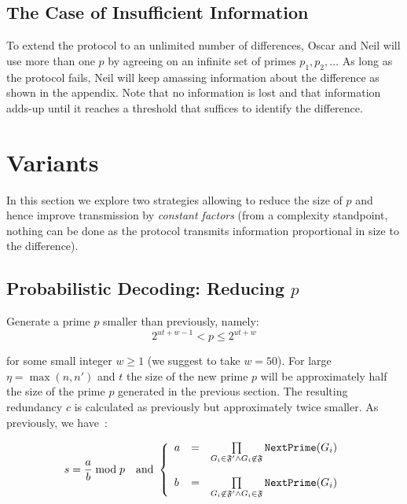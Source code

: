 \documentclass[11pt]{llncs}
\begin{document}
\subsection{The Case of Insufficient Information}

To extend the protocol to an unlimited number of differences, Oscar and Neil will use more than one $p$ by agreeing on an infinite set of primes $p_1,p_2,\ldots$ As long as the protocol fails, Neil will keep amassing information about the difference as shown in the appendix. Note that no information is lost and that information adds-up until it reaches a threshold that suffices to identify the difference.

\section{Variants}

In this section we explore two strategies allowing to reduce the size of $p$ and hence improve transmission by {\sl constant factors} (from a complexity standpoint, nothing can be done as the protocol transmits information proportional in size to the difference).

\subsection{Probabilistic Decoding: Reducing $p$}

Generate a prime $p$ smaller than previously, namely:
\begin{equation}
\label{eqnewp}
2^{ut+w-1}<p \leq 2^{ut+w}
\end{equation}

for some small integer $w \geq 1$ (we suggest to take $w=50$). For large $\eta=\max(n,n')$ and $t$ the size of the new prime $p$ will be approximately half the size of the prime $p$ generated in the previous section. The resulting redundancy $c$ is calculated as previously but approximately twice smaller. As previously, we have~:

$$
s=\frac{a}{b} \bmod p{~~~\mbox{and~}}
\left\{
\begin{array}{lcr}
a & =&  \prod\limits_{G_i \in \mathfrak{F}'\wedge G_i \not\in\mathfrak{F}} \mbox{{\tt NextPrime}}(G_i) \\
\\
b & = & \prod\limits_{G_i \not\in\mathfrak{F}' \wedge G_i \in\mathfrak{F}} \mbox{{\tt NextPrime}}(G_i)
\end{array}
\right.
$$
\end{document}
